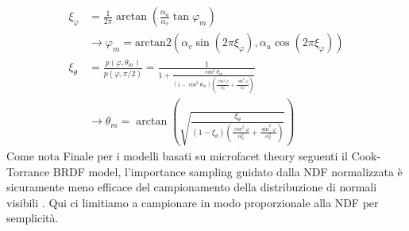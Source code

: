 \begin{align}
	\xi_\varphi&=\frac{1}{2\pi}\arctan\left(\frac{\alpha_u}{\alpha_v}\tan\varphi_m\right)\nonumber\\
		&\longrightarrow\varphi_m=\mathrm{arctan2}(\alpha_v\sin(2\pi\xi_\varphi),\alpha_u\cos(2\pi\xi_\varphi))\\
	\xi_\theta&=\frac{p(\varphi,\theta_m)}{p(\varphi,\pi/2)}=\frac{1}{1+\frac{\cos^2\theta_m}%
		{(1-\cos^2\theta_m)\left(\frac{\cos^2\varphi}{\alpha_u^2}+\frac{\sin^2\varphi}{\alpha_v^2}\right)}} \nonumber\\
		&\longrightarrow\theta_m=%
		\arctan\left(\sqrt{\frac{\xi_\theta}{(1-\xi_\theta)\left(\frac{\cos^2\varphi}{\alpha_u^2}+\frac{\sin^2\varphi}{\alpha_v^2}\right)}}\right)
\end{align}
Come nota Finale per i modelli basati su microfacet theory seguenti il Cook-Torrance BRDF model, l'importance sampling guidato dalla NDF normalizzata
\`e sicuramente meno efficace del campionamento della distribuzione di normali visibili \cite{pharr}. Qui ci limitiamo a campionare in modo 
proporzionale alla NDF per semplicit\`a.
